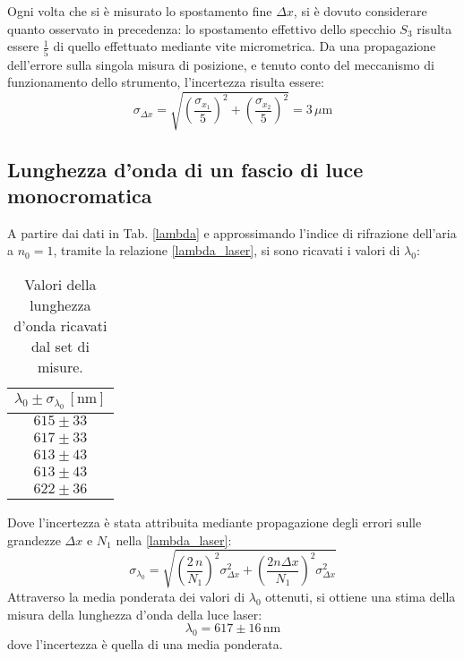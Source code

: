\documentclass[]{article}
\let\oldsubsection\subsection%
\renewcommand{\subsection}{%
	\renewcommand{\theequation}{\thesubsection.\arabic{equation}}%
	\oldsubsection}%
\begin{document}
Ogni volta che si è misurato lo spostamento fine $\Delta x$, si è dovuto considerare quanto osservato in precedenza: lo spostamento effettivo dello specchio $S_3$ risulta essere $\frac{1}{5}$ di quello effettuato mediante vite micrometrica. Da una propagazione dell'errore sulla singola misura di posizione, e tenuto conto del meccanismo di funzionamento dello strumento, l'incertezza risulta essere:
\begin{equation}
    \label{err-delta-x}
    \sigma_{\Delta x} = \sqrt{ \left(\frac{\sigma_{x_1}}{5}\right)^2 + \left(\frac{\sigma_{x_2}}{5}\right)^2} = 3 \, \mu \text{m}
\end{equation}

\subsection{Lunghezza d'onda di un fascio di luce monocromatica}

A partire dai dati in Tab. \ref{lambda} e approssimando l'indice di rifrazione dell'aria a $n_0=1$, tramite la relazione \ref{lambda_laser}, si sono ricavati i valori di $\lambda_0$:

\begin{table}[H]
    \centering
    
    \begin{tabular}{||c||}
        \hline
        $\lambda_0 \pm \sigma_{\lambda_0} \, \left[\text{nm}\right]$ \\
        \hline\hline

        $615 \pm 33$ \\\hline
        $617 \pm 33$ \\\hline
        $613 \pm 43$ \\\hline
        $613 \pm 43$ \\\hline
        $622 \pm 36$ \\\hline
    
    \end{tabular}
    \caption{Valori della lunghezza d'onda ricavati dal set di misure.}
    \label{tab:lambda}
\end{table}
Dove l'incertezza è stata attribuita mediante propagazione degli errori sulle grandezze $\Delta x$ e $N_1$ nella \ref{lambda_laser}:
\begin{equation}
\label{err-lambda}
\sigma_{\lambda_0} = \sqrt{ \left( \frac{2 \, n}{N_1}\right)^2 \sigma^2_{\Delta x} +  \left(\frac{2 n \Delta x}{N_1} \right)^2 \sigma^2_{\Delta x} }
\end{equation}
Attraverso la media ponderata dei valori di $\lambda_0$ ottenuti, si ottiene una stima della misura della lunghezza d'onda della luce laser:
\begin{equation}
\label{lambda-value}
\lambda_0 = 617 \pm 16 \, \text{nm}
\end{equation}
dove l'incertezza è quella di una media ponderata.
\end{document}
